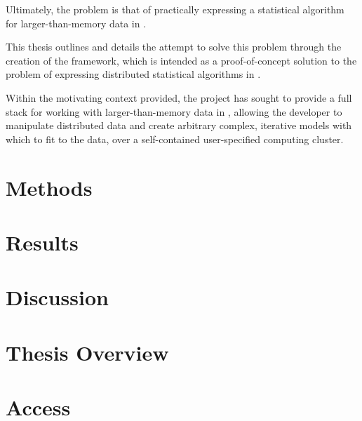 Ultimately, the problem is that of practically expressing a statistical algorithm for larger-than-memory data in \R{}.

This thesis outlines and details the attempt to solve this problem through the creation of the \lsr{} framework, which is intended as a proof-of-concept solution to the problem of expressing distributed statistical algorithms in \R{}.

Within the motivating context provided, the \lsr{} project has sought to provide a full stack for working with larger-than-memory data in \R{}, allowing the developer to manipulate distributed data and create arbitrary complex, iterative models with which to fit to the data, over a self-contained user-specified computing cluster.

\section{Methods}\label{sec:methods}

\section{Results}\label{sec:results}

\section{Discussion}\label{sec:discussion}

\section{Thesis Overview}\label{sec:intro-overview}

\section{Access}\label{sec:access}

